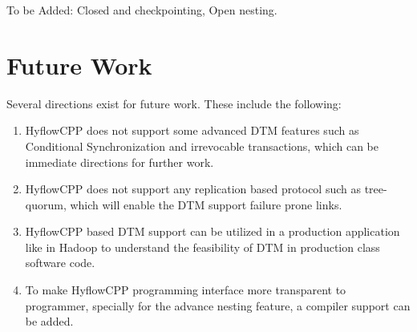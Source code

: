 \documentclass[12pt,english]{report}
\begin{document}
To be Added: Closed and checkpointing, Open nesting.


\section{Future Work}

Several directions exist for future work. These include the following:

\begin{enumerate}
\item HyflowCPP does not support some advanced DTM features such as Conditional Synchronization and 
irrevocable transactions, which can be immediate directions for further work.
\item HyflowCPP does not support any replication based protocol such as tree-quorum, which will enable the DTM support failure prone links.
\item HyflowCPP based DTM support can be utilized in a production application like in Hadoop to understand the feasibility of DTM in production class software code.
\item To make HyflowCPP programming interface more transparent to programmer, specially for the advance nesting feature, a compiler support can be added. 
\end{enumerate}

\newpage
{}



\end{document}
